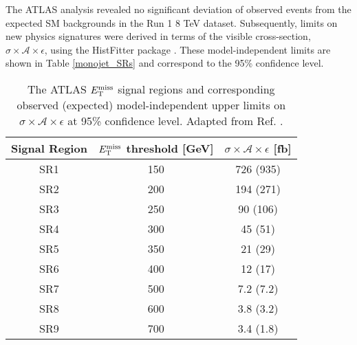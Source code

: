 The ATLAS \monojet analysis revealed no significant deviation of observed events from the expected SM backgrounds in the Run 1 8 TeV dataset. Subsequently, limits on new physics signatures were derived in terms of the visible cross-section, $\sigma\times\mathcal{A}\times\epsilon$, using the HistFitter package \cite{}. These model-independent limits are shown in Table \ref{monojet_SRs} and correspond to the 95\% confidence level.

\begin{table}[!htbp]
\centering
\begin{tabular}{c|c|c}
 \hline
 \hline
 Signal Region & $E_{\mathrm{T}}^{\mathrm{miss}}$ threshold [GeV] & $\sigma \times \mathcal{A} \times \epsilon$ [fb] \\ %
 \hline
 SR1 & 150 & 726 (935) \\ %
 SR2 & 200 & 194 (271) \\ %
 SR3 & 250 & 90 (106) \\ %
 SR4 & 300 & 45 (51) \\ %
 SR5 & 350 & 21 (29) \\ %
 SR6 & 400 & 12 (17) \\ %
 SR7 & 500 & 7.2 (7.2) \\ %
 SR8 & 600 & 3.8 (3.2) \\ %
 SR9 & 700 & 3.4 (1.8) \\ %
 \hline
 \hline
\end{tabular}
\caption{The ATLAS \monojet $E_{\mathrm{T}}^{\mathrm{miss}}$ signal regions and corresponding observed (expected) model-independent upper limits on $\sigma \times \mathcal{A} \times \epsilon$ at 95\% confidence level. Adapted from Ref. \cite{Aad:2015zva}.
}
\end{table}
